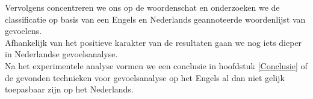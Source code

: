 Vervolgens concentreren we ons op de woordenschat en  onderzoeken we de classificatie op basis van een Engels en Nederlands geannoteerde woordenlijst van gevoelens.\\
Afhankelijk van het positieve karakter van de resultaten gaan we nog iets dieper in Nederlandse gevoelsanalyse.\\
Na het experimentele analyse vormen we een conclusie in hoofdstuk \ref{Conclusie} of de gevonden technieken voor gevoelsanalyse op het Engels al dan niet gelijk toepasbaar zijn op het Nederlands. 